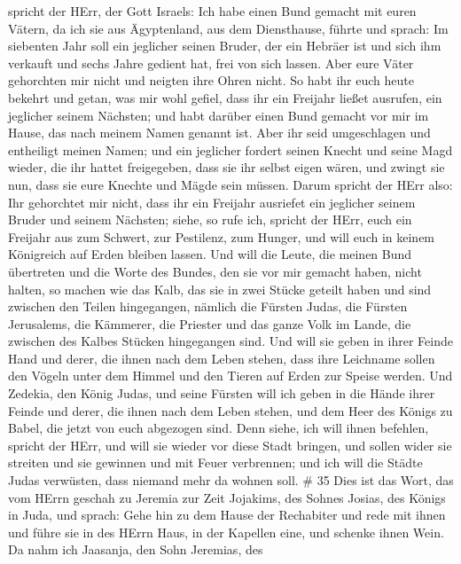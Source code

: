 spricht der HErr, der Gott Israels: Ich habe einen Bund gemacht mit
euren Vätern, da ich sie aus Ägyptenland, aus dem Diensthause, führte
und sprach:  Im siebenten Jahr soll ein jeglicher seinen
Bruder, der ein Hebräer ist und sich ihm verkauft und sechs Jahre
gedient hat, frei von sich lassen. Aber eure Väter gehorchten mir nicht
und neigten ihre Ohren nicht.  So habt ihr euch heute
bekehrt und getan, was mir wohl gefiel, dass ihr ein Freijahr ließet
ausrufen, ein jeglicher seinem Nächsten; und habt darüber einen Bund
gemacht vor mir im Hause, das nach meinem Namen genannt ist.
 Aber ihr seid umgeschlagen und entheiligt meinen Namen;
und ein jeglicher fordert seinen Knecht und seine Magd wieder, die ihr
hattet freigegeben, dass sie ihr selbst eigen wären, und zwingt sie nun,
dass sie eure Knechte und Mägde sein müssen.  Darum spricht
der HErr also: Ihr gehorchtet mir nicht, dass ihr ein Freijahr ausriefet
ein jeglicher seinem Bruder und seinem Nächsten; siehe, so rufe ich,
spricht der HErr, euch ein Freijahr aus zum Schwert, zur Pestilenz, zum
Hunger, und will euch in keinem Königreich auf Erden bleiben lassen.
 Und will die Leute, die meinen Bund übertreten und die
Worte des Bundes, den sie vor mir gemacht haben, nicht halten, so machen
wie das Kalb, das sie in zwei Stücke geteilt haben und sind zwischen den
Teilen hingegangen,  nämlich die Fürsten Judas, die Fürsten
Jerusalems, die Kämmerer, die Priester und das ganze Volk im Lande, die
zwischen des Kalbes Stücken hingegangen sind.  Und will sie
geben in ihrer Feinde Hand und derer, die ihnen nach dem Leben stehen,
dass ihre Leichname sollen den Vögeln unter dem Himmel und den Tieren
auf Erden zur Speise werden.  Und Zedekia, den König Judas,
und seine Fürsten will ich geben in die Hände ihrer Feinde und derer,
die ihnen nach dem Leben stehen, und dem Heer des Königs zu Babel, die
jetzt von euch abgezogen sind.  Denn siehe, ich will ihnen
befehlen, spricht der HErr, und will sie wieder vor diese Stadt bringen,
und sollen wider sie streiten und sie gewinnen und mit Feuer verbrennen;
und ich will die Städte Judas verwüsten, dass niemand mehr da wohnen
soll. \# 35  Dies ist das Wort, das vom HErrn geschah zu
Jeremia zur Zeit Jojakims, des Sohnes Josias, des Königs in Juda, und
sprach:  Gehe hin zu dem Hause der Rechabiter und rede mit
ihnen und führe sie in des HErrn Haus, in der Kapellen eine, und schenke
ihnen Wein.  Da nahm ich Jaasanja, den Sohn Jeremias, des

